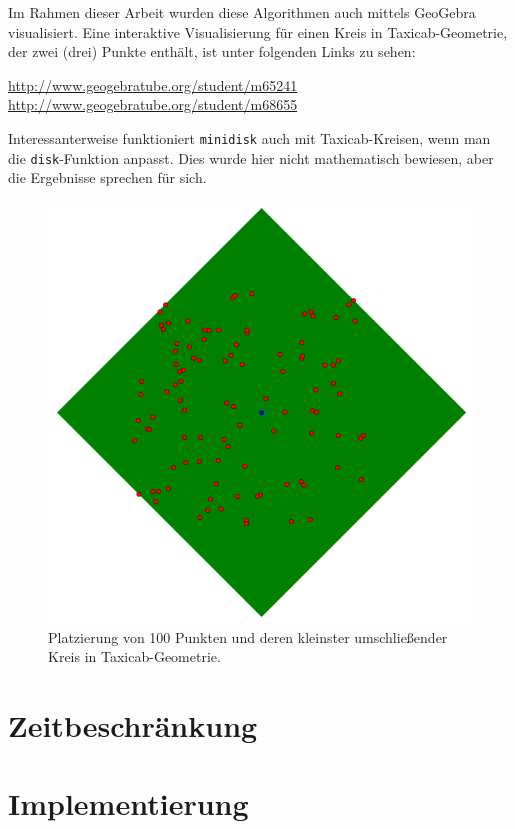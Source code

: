 \documentclass{article}
\begin{document}
Im Rahmen dieser Arbeit wurden diese Algorithmen auch mittels GeoGebra visualisiert. Eine interaktive Visualisierung
für einen Kreis in Taxicab-Geometrie, der zwei (drei) Punkte enthält, ist unter folgenden Links zu sehen: 

\url{http://www.geogebratube.org/student/m65241} \newline
\url{http://www.geogebratube.org/student/m68655}

Interessanterweise funktioniert \texttt{minidisk} auch mit Taxicab-Kreisen, wenn man die \texttt{disk}-Funktion anpasst. Dies wurde hier nicht mathematisch bewiesen, aber die Ergebnisse sprechen für sich.

\begin{figure}[!ht]
  \centering
  \includegraphics[width=.9\textwidth]{img/taxicab_minidisk.png}
  \caption{Platzierung von 100 Punkten und deren kleinster umschließender Kreis in Taxicab-Geometrie.}
  \label{img:taxicab_minidisk}
\end{figure}

\section{Zeitbeschränkung}

\clearpage
\section{Implementierung}
\end{document}
